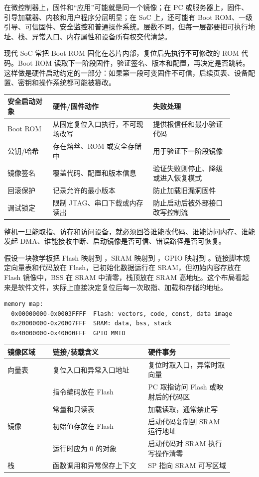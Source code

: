 在微控制器上，固件和“应用”可能就是同一个镜像；在 PC 或服务器上，固件、引导加载器、内核和用户程序分层明显；在 SoC 上，还可能有 Boot ROM、一级引导、可信固件、安全监控和普通操作系统。层数不同，但每一层都要把可执行地址、栈、异常入口、内存属性和设备所有权交代清楚。

现代 SoC 常把 Boot ROM 固化在芯片内部，复位后先执行不可修改的 ROM 代码。Boot ROM 读取下一阶段固件，验证签名、版本和配置，再决定是否跳转。这样做是硬件启动约定的一部分：如果第一段可变固件不可信，后续页表、设备配置、密钥和操作系统都可能被篡改。

\begin{longtable}{L{0.18\linewidth}L{0.4\linewidth}L{0.32\linewidth}}
\toprule
安全启动对象 & 硬件/固件动作 & 失败处理 \\
\midrule
Boot ROM & 从固定复位入口执行，不可现场改写 & 提供根信任和最小验证代码 \\
公钥/哈希 & 存在熔丝、ROM 或安全存储中 & 用于验证下一阶段镜像 \\
镜像签名 & 覆盖代码、配置和版本信息 & 验证失败则停止、降级或进入恢复模式 \\
回滚保护 & 记录允许的最小版本 & 防止加载旧漏洞固件 \\
调试锁定 & 限制 JTAG、串口下载或内存读出 & 防止启动后被外部接口改写控制流 \\
\bottomrule
\end{longtable}

整机一旦能取指、访存和访问设备，就必须回答谁能改代码、谁能访问内存、谁能发起 DMA、谁能接收中断、启动镜像是否可信、错误路径是否可恢复。

假设一块教学板把 Flash 映射到 ，SRAM 映射到 ，GPIO 映射到 。链接脚本规定向量表和代码放在 Flash，已初始化数据运行在 SRAM，但初始内容存放在 Flash 镜像中，BSS 在 SRAM 中清零，栈顶放在 SRAM 高地址。这个布局看起来是软件文件，实际上直接决定复位后每一次取指、加载和存储的地址。

\begin{lstlisting}
memory map:
  0x00000000-0x0003FFFF  Flash: vectors, code, const, data image
  0x20000000-0x20007FFF  SRAM: data, bss, stack
  0x40000000-0x40000FFF  GPIO MMIO
\end{lstlisting}

\begin{longtable}{L{0.18\linewidth}L{0.38\linewidth}L{0.34\linewidth}}
\toprule
镜像区域 & 链接/装载含义 & 硬件事务 \\
\midrule
向量表 & 复位入口和异常入口地址 & 复位时取入口，异常时取向量 \\
 & 指令编码放在 Flash & PC 取指访问 Flash 或映射后的代码区 \\
 & 常量和只读表 & 加载读取，通常禁止写 \\
 镜像 & 初始值存放在 Flash & 启动代码复制到 SRAM 运行地址 \\
 & 运行时应为 0 的对象 & 启动代码对 SRAM 执行写操作清零 \\
栈 & 函数调用和异常保存上下文 & SP 指向 SRAM 可写区域 \\
\bottomrule
\end{longtable}

